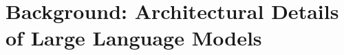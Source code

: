 \documentclass[11pt,a4paper]{article}
\begin{document}
\section{Background: Architectural Details of Large Language Models}





\end{document}
